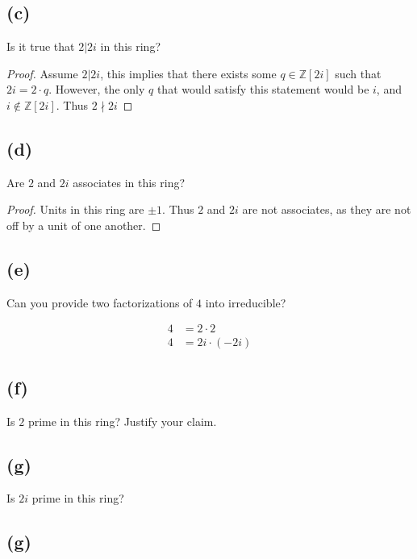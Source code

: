 \documentclass[10pt]{armath}
\newcommand{\zi}{\mathbb{Z}\left[2i\right]}
\begin{document}
\subsection*{(c)}%
\label{sub:_c_}

Is it true that $2|2i$ in this ring?

\begin{proof}
   Assume $2|2i$, this implies that there exists some $q\in\zi$ such that
   $2i=2\cdot q$. However, the only $q$ that would satisfy this statement would
   be $i$, and $i\notin\zi$. Thus $2\nmid2i$
\end{proof}

\subsection*{(d)}%
\label{sub:_d_}

Are $2$ and $2i$ associates in this ring?

\begin{proof}
   Units in this ring are $\pm 1$. Thus $2$ and $2i$ are not associates, as
   they are not off by a unit of one another.
\end{proof}

\subsection*{(e)}%
\label{sub:_e_}

Can you provide two factorizations of $4$ into irreducible?

\begin{align*}
  4&=2\cdot 2\\
  4&=2i\cdot(-2i)
\end{align*}

\subsection*{(f)}%
\label{sub:_f_}

Is $2$ prime in this ring? Justify your claim.

\subsection*{(g)}%
\label{sub:_g_}

Is $2i$ prime in this ring?

\subsection*{(g)}%
\label{sub:_g_}
\end{document}
